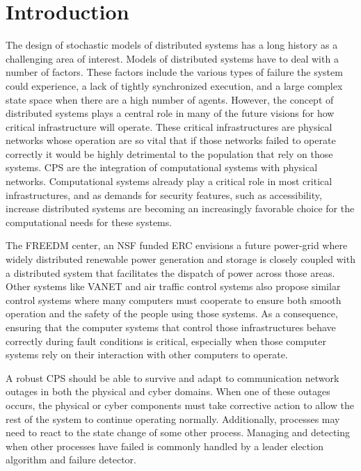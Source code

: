 \chapter{Introduction}

The design of stochastic models of distributed systems has a long history as a challenging area of interest.
Models of distributed systems have to deal with a number of factors.
These factors include the various types of failure the system could experience, a lack of tightly synchronized execution, and a large complex state space when there are a high number of agents\cite{DISTRIBUTED}\cite{distributed-challenges}. 
However, the concept of distributed systems plays a central role in many of the future visions for how critical infrastructure will operate.
These critical infrastructures are physical networks whose operation are so vital that if those networks failed to operate correctly it would be highly detrimental to the population that rely on those systems.
\ac{CPS} are the integration of computational systems with physical networks.
Computational systems already play a critical role in most critical infrastructures, and as demands for security features, such as accessibility, increase distributed systems are becoming an increasingly favorable choice for the computational needs for these systems\cite{SMARTGRIDBENEFITS}.

The \ac{FREEDM} center\cite{FREEDM}, an NSF funded ERC envisions a future power-grid where widely distributed renewable power generation and storage is closely coupled with a distributed system that facilitates the dispatch of power across those areas.
Other systems like \ac{VANET}\cite{CARS1}\cite{CARS2}\cite{vanet-congestion} and air traffic control systems\cite{AIRTRAFFIC1}\cite{AIRTRAFFIC2} also propose similar control systems where many computers must cooperate to ensure both smooth operation and the safety of the people using those systems.
As a consequence, ensuring that the computer systems that control those infrastructures behave correctly during fault conditions is critical, especially when those computer systems rely on their interaction with other computers to operate.

A robust \ac{CPS} should be able to survive and adapt to communication network outages in both the physical and cyber domains.
When one of these outages occurs, the physical or cyber components must take corrective action to allow the rest of the system to continue operating normally.
Additionally, processes may need to react to the state change of some other process.
Managing and detecting when other processes have failed is commonly handled by a leader election algorithm and failure detector.

